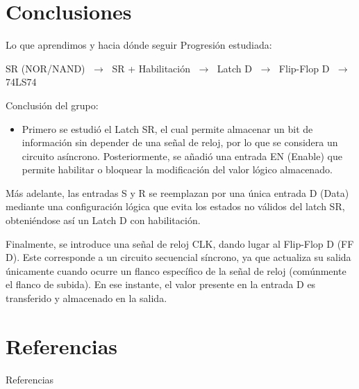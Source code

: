\documentclass[presentation]{beamer}
\begin{document}
\section{Conclusiones}
\label{sec:org883bdfd}

\begin{frame}[allowframebreaks]{Lo que aprendimos y hacia dónde seguir}
\alert{Progresión estudiada:}

\begin{center}
SR (NOR/NAND) \(\;\longrightarrow\;\) SR + Habilitación \(\;\longrightarrow\;\)
Latch D \(\;\longrightarrow\;\) Flip-Flop D \(\;\longrightarrow\;\) 74LS74
\end{center}

\alert{Conclusión del grupo:}
\begin{itemize}
\item Primero se estudió el Latch SR, el cual permite almacenar un bit de información sin depender de una señal de reloj, por lo que se considera un circuito asíncrono. Posteriormente, se añadió una entrada EN (Enable) que permite habilitar o bloquear la modificación del valor lógico almacenado.
\end{itemize}

Más adelante, las entradas S y R se reemplazan por una única entrada D (Data) mediante una configuración lógica que evita los estados no válidos del latch SR, obteniéndose así un Latch D con habilitación.

Finalmente, se introduce una señal de reloj CLK, dando lugar al Flip-Flop D (FF D). Este corresponde a un circuito secuencial síncrono, ya que actualiza su salida únicamente cuando ocurre un flanco específico de la señal de reloj (comúnmente el flanco de subida). En ese instante, el valor presente en la entrada D es transferido y almacenado en la salida.
\end{frame}


\section{Referencias}
\label{sec:org268c239}

\begin{frame}[allowframebreaks]{Referencias}
\printbibliography
\end{frame}
\end{document}
